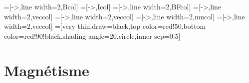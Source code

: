 \renewcommand\thesection{XI}

=[->,line width=2,Bcol]
=[->,Icol] %
=[->,line width=2,BFcol]
=[->,line width=2,veccol]
=[->,line width=2,veccol]
=[->,line width=2,mucol]
=[->,line width=2,veccol]
=[very thin,draw=black,top color=red!50,bottom color=red!90!black,shading angle=20,circle,inner sep=0.5]

\section{Magnétisme}
